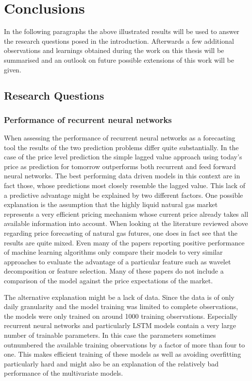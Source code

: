 \chapter{Conclusions}\label{Sec:Conc}
In the following paragraphs the above illustrated results will be used to answer the research questions posed in the introduction. Afterwards a few additional observations and learnings obtained during the work on this thesis will be summarised and an outlook on future possible extensions of this work will be given.
\section{Research Questions}
\subsection{Performance of recurrent neural networks}
When assessing the performance of recurrent neural networks as a forecasting tool the results of the two prediction problems differ quite substantially. In the case of the price level prediction the simple lagged value approach using today's price as prediction for tomorrow outperforms both recurrent and feed forward neural networks. The best performing data driven models in this context are in fact those, whose predictions most closely resemble the lagged value. This lack of a predictive advantage might be explained by two different factors. One possible explanation is the assumption that the highly liquid natural gas market represents a very efficient pricing mechanism whose current price already takes all available information into account. When looking at the literature reviewed above regarding price forecasting of natural gas futures, one does in fact see that the results are quite mixed. Even many of the papers reporting positive performance of machine learning algorithms only compare their models to very similar approaches to evaluate the advantage of a particular feature such as wavelet decomposition or feature selection. Many of these papers do not include a comparison of the model against the price expectations of the market.

The alternative explanation might be a lack of data. Since the data is of only daily granularity and the model training was limited to complete observations, the models were only trained on around 1000 training observations. Especially recurrent neural networks and particularly LSTM models contain a very large number of trainable parameters. In this case the parameters sometimes outnumbered the available training observations by a factor of more than four to one. This makes efficient training of these models as well as avoiding overfitting particularly hard and might also be an explanation of the relatively bad performance of the multivariate models. 

